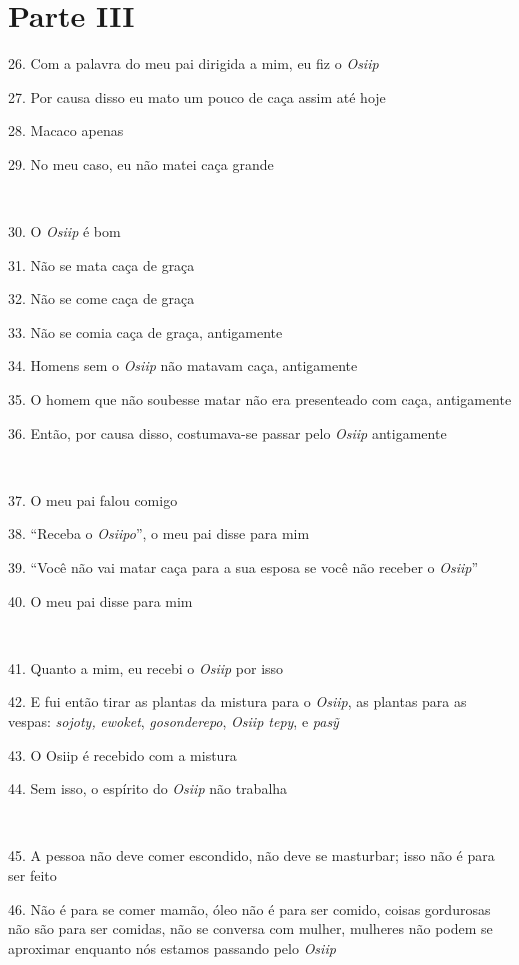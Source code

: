 \section{Parte III}

26. Com a palavra do meu pai dirigida a mim, eu fiz o \emph{Osiip}

27. Por causa disso eu mato um pouco de caça assim até hoje

28. Macaco apenas

29. No meu caso, eu não matei caça grande

~

30. O \emph{Osiip} é bom

31. Não se mata caça de graça

32. Não se come caça de graça

33. Não se comia caça de graça, antigamente

34. Homens sem o \emph{Osiip} não matavam caça, antigamente

35. O homem que não soubesse matar não era presenteado com caça,
antigamente

36. Então, por causa disso, costumava-se passar pelo \emph{Osiip}
antigamente

~

37. O meu pai falou comigo

38. ``Receba o \emph{Osiipo}'', o meu pai disse para mim

39. ``Você não vai matar caça para a sua esposa se você não receber o
\emph{Osiip}''

40. O meu pai disse para mim

~

41. Quanto a mim, eu recebi o \emph{Osiip} por isso

42. E fui então tirar as plantas da mistura para o \emph{Osiip}, as
plantas para as vespas: \emph{sojoty,} \emph{ewoket},
\emph{gosonderepo}, \emph{Osiip tepy}, e \emph{pasỹ}

43. O Osiip é recebido com a mistura

44. Sem isso, o espírito do \emph{Osiip} não trabalha

~

45. A pessoa não deve comer escondido, não deve se masturbar; isso não é
para ser feito

46. Não é para se comer mamão, óleo não é para ser comido, coisas
gordurosas não são para ser comidas, não se conversa com mulher,
mulheres não podem se aproximar enquanto nós estamos passando pelo
\emph{Osiip}

